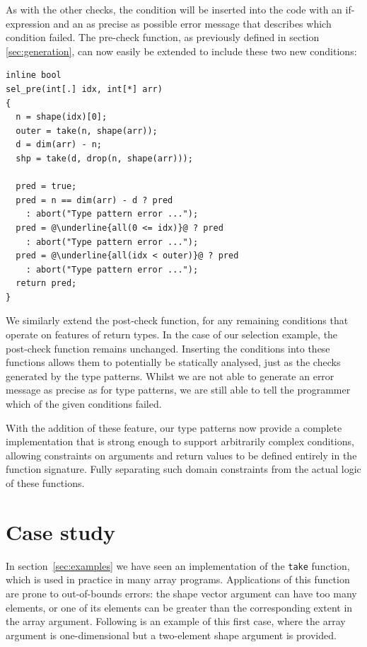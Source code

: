 \documentclass[sigconf,screen]{acmart}
\begin{document}
As with the other checks, the condition will be inserted into the code with an if-expression and an as precise as possible error message that describes which condition failed.
The pre-check function, as previously defined in section \ref{sec:generation}, can now easily be extended to include these two new conditions:

\begin{lstlisting}[escapechar=@]
inline bool
sel_pre(int[.] idx, int[*] arr)
{
  n = shape(idx)[0];
  outer = take(n, shape(arr));
  d = dim(arr) - n;
  shp = take(d, drop(n, shape(arr)));

  pred = true;
  pred = n == dim(arr) - d ? pred
    : abort("Type pattern error ...");
  pred = @\underline{all(0 <= idx)}@ ? pred
    : abort("Type pattern error ...");
  pred = @\underline{all(idx < outer)}@ ? pred
    : abort("Type pattern error ...");
  return pred;
}
\end{lstlisting}

We similarly extend the post-check function, for any remaining conditions that operate on features of return types.
In the case of our selection example, the post-check function remains unchanged.
Inserting the conditions into these functions allows them to potentially be statically analysed, just as the checks generated by the type patterns.
Whilst we are not able to generate an error message as precise as for type patterns, we are still able to tell the programmer which of the given conditions failed.

With the addition of these feature, our type patterns now provide a complete implementation that is strong enough to support arbitrarily complex conditions, allowing constraints on arguments and return values to be defined entirely in the function signature.
Fully separating such domain constraints from the actual logic of these functions.

\section{Case study}
In section~\ref{sec:examples} we have seen an implementation of the \texttt{take} function, which is used in practice in many array programs.
Applications of this function are prone to out-of-bounds errors: the shape vector argument can have too many elements, or one of its elements can be greater than the corresponding extent in the array argument.
Following is an example of this first case, where the array argument is one-dimensional but a two-element shape argument is provided.
\end{document}
